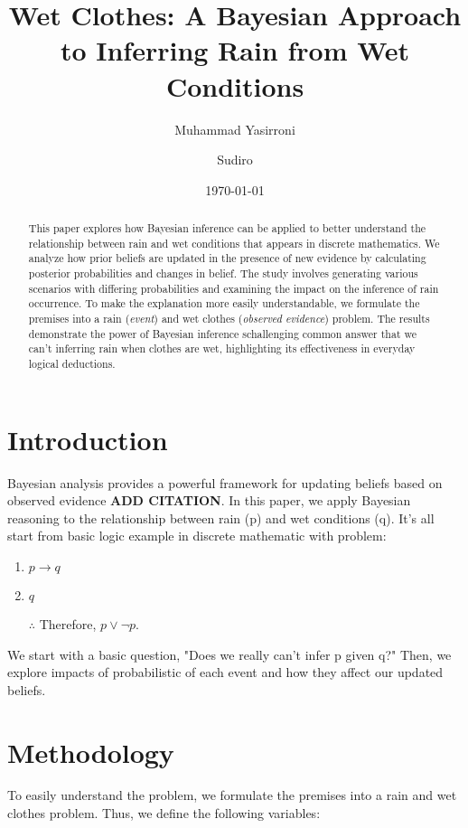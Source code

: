 \documentclass[10pt,letterpaper]{article}
\title{Wet Clothes: A Bayesian Approach to Inferring Rain from Wet Conditions}
\author{Muhammad Yasirroni \and Sudiro}
\date{\today}
\begin{document}
\maketitle

\begin{abstract}
This paper explores how Bayesian inference can be applied to better understand the relationship between rain and wet conditions that appears in discrete mathematics. We analyze how prior beliefs are updated in the presence of new evidence by calculating posterior probabilities and changes in belief. The study involves generating various scenarios with differing probabilities and examining the impact on the inference of rain occurrence. To make the explanation more easily understandable, we formulate the premises into a rain (\emph{event}) and wet clothes (\emph{observed evidence}) problem. The results demonstrate the power of Bayesian inference schallenging common answer that we can't inferring rain when clothes are wet, highlighting its effectiveness in everyday logical deductions.
\end{abstract}

\section{Introduction}
Bayesian analysis provides a powerful framework for updating beliefs based on observed evidence \textbf{ADD CITATION}. In this paper, we apply Bayesian reasoning to the relationship between rain (p) and wet conditions (q). It's all start from basic logic example in discrete mathematic with problem:

\begin{enumerate}
    \item $p \rightarrow q$
    \item $q$
    \item[$\therefore$] Therefore, $p \vee \neg p$.
\end{enumerate}

We start with a basic question, "Does we really can't infer p given q?" Then, we explore impacts of probabilistic of each event and how they affect our updated beliefs.

\section{Methodology}

To easily understand the problem, we formulate the premises into a rain and wet clothes problem. Thus, we define the following variables:
\end{document}
